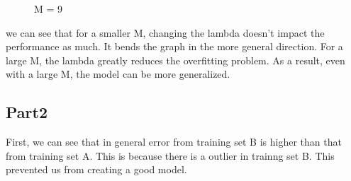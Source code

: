 \begin{figure}[!htb]
  \caption{M = 9}\label{fig:figures/p3_bishop_m=9}
\endminipage
\end{figure}






we can see that for a smaller M, changing the lambda doesn't impact the performance as much. It bends the graph in the more general direction. For a large M, the lambda greatly reduces the overfitting problem. As a result, even with a large M, the model can be more generalized. 

\subsection{Part2}





First, we can see that in general error from training set B is higher than that from training set A. 
This is because there is a outlier in trainng set B. This prevented us from creating a good model. 



